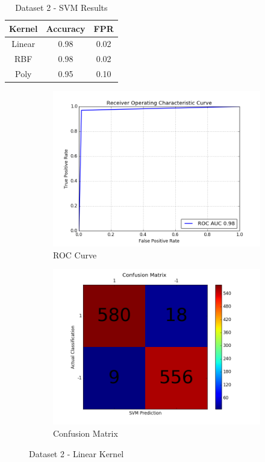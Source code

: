 \begin{table}[htb]
	\centering
	\caption{Dataset 2 - SVM Results}
	\begin{tabular}{ |c|c|c| } 
		\hline
		Kernel & Accuracy & FPR \\
		\hline
		Linear & 0.98 & 0.02 \\ 
		\hline
		RBF & 0.98 & 0.02 \\ 
		\hline
		Poly & 0.95 & 0.10 \\ 
		\hline
	\end{tabular}
	\label{table:Dataset2_svm_results}
\end{table}



\begin{figure}[h]
	
	\begin{subfigure}{0.5\textwidth}
		\includegraphics[width=0.9\linewidth]{images/AUC-Dataset2-linear} 
		\caption{ROC Curve}
		\label{fig:AUC_Dataset2_linear}
	\end{subfigure}
	\begin{subfigure}{0.5\textwidth}
		\includegraphics[width=0.9\linewidth]{images/CM-Dataset2-linear}
		\caption{Confusion Matrix}
		\label{fig:CM_Dataset2_linear}
	\end{subfigure}
	
	\caption{Dataset 2 - Linear Kernel}
	\label{fig:Dataset2_linear_results}
\end{figure}



